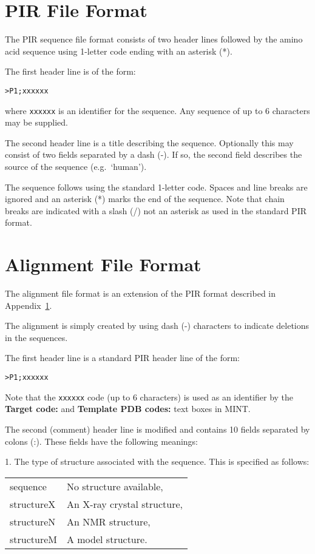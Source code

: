 \section{PIR File Format}
\label{app:pir}
The PIR sequence file format consists of two header lines followed by
the amino acid sequence using 1-letter code ending with an asterisk
(*).

The first header line is of the form:
\begin{verbatim}
>P1;xxxxxx
\end{verbatim}
where {\tt xxxxxx} is an identifier for the sequence. Any sequence of up to
6 characters may be supplied.

The second header line is a title describing the sequence. Optionally
this may consist of two fields separated by a dash (-). If so, the
second field describes the source of the sequence (e.g.\ `human').

The sequence follows using the standard 1-letter code. Spaces and line
breaks are ignored and an asterisk (*) marks the end of the
sequence. Note that chain breaks are indicated with a slash (/) not an
asterisk as used in the standard PIR format.









\section{Alignment File Format}
\label{app:align}
The alignment file format is an extension of the PIR format described
in Appendix~\ref{app:pir}.

The alignment is simply created by using dash (-) characters to
indicate deletions in the sequences. 

The first header line is a standard PIR header line of the form:
\begin{verbatim}
>P1;xxxxxx
\end{verbatim}
Note that the {\tt xxxxxx} code (up to 6 characters) is used as an
identifier by the {\bfseries Target code:} and {\bfseries Template PDB
codes:} text boxes in MINT.

The second (comment) header line is modified and contains 10 fields
separated by colons (:). These fields have the following meanings:

1. The type of structure associated with the sequence. This is
specified as follows:
\begin{center}
\begin{tabular}{ll}
   sequence    & No structure available,        \\
   structureX  & An X-ray crystal structure,    \\
   structureN  & An NMR structure,              \\
   structureM  & A model structure.             \\
\end{tabular}
\end{center}

